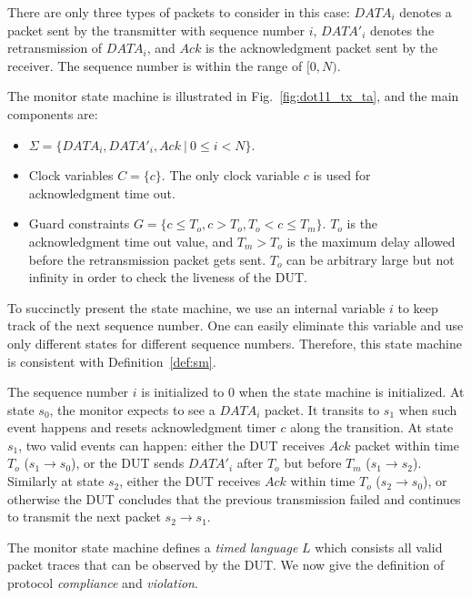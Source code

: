 There are only three types of packets to consider in this case: $DATA_i$ denotes
a packet sent by the transmitter with sequence number $i$, $DATA'_i$ denotes the
retransmission of $DATA_i$, and $Ack$ is the acknowledgment packet sent by the
receiver.
%
The sequence number is within the range of $[0, N)$.


The monitor state machine is illustrated in Fig.~\ref{fig:dot11_tx_ta}, and
the main components are:

\begin{itemize}
  \item $\Sigma = \{DATA_i, DATA'_i, Ack\ |\ 0 \le i < N\}$.
  \item Clock variables $C = \{c\}$. The only clock variable $c$ is
    used for acknowledgment time out.
  \item Guard constraints $G = \{ c \le T_o, c > T_o, T_o < c \le T_m\}$.
    $T_o$ is the acknowledgment time out value, and $T_m >
    T_o$ is the maximum delay allowed before the retransmission packet gets
    sent. $T_o$ can be arbitrary large but not infinity in order to check the
    liveness of the DUT.
\end{itemize}



To succinctly present the state machine, we use an internal variable $i$ to keep
track of the next sequence number.
%
One can easily eliminate this variable and
use only different states for different sequence numbers.
%
Therefore, this state machine is consistent with Definition~\ref{def:sm}.



The sequence number $i$ is initialized to 0 when the state machine is
initialized.
%
At state $s_0$, the monitor expects to see a $DATA_i$ packet.
%
It transits to $s_1$ when such event happens and resets acknowledgment timer $c$ along the transition.
%
At state $s_1$, two valid events can happen: either the DUT receives $Ack$ packet
within time $T_o$ ($s_1\rightarrow s_0$), or the DUT sends $DATA'_i$ after $T_o$
but before $T_m$ ($s_1 \rightarrow s_2$).
%
Similarly at state $s_2$, either the DUT receives $Ack$ within time $T_o$ ($s_2
\rightarrow s_0$), or otherwise the DUT concludes that the previous transmission
failed and continues to transmit the next packet $s_2\rightarrow s_1$.

The monitor state machine defines a \textit{timed language} $L$ which consists
all valid packet traces that can be observed by the DUT.
%
We now give the
definition of protocol \textit{compliance} and \textit{violation}.

